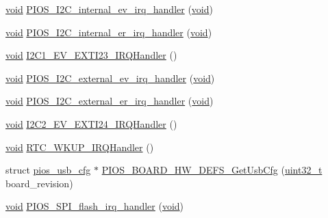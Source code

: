 \begin{DoxyCompactItemize}
\item 
\hyperlink{group___n_a_m_e_ga18028b8badbf1ea7e704ccac3c488e82}{void} \hyperlink{group___tau_labs_core_gad333f8aeebdfbaca768540198dbc3520}{P\-I\-O\-S\-\_\-\-I2\-C\-\_\-internal\-\_\-ev\-\_\-irq\-\_\-handler} (\hyperlink{group___n_a_m_e_ga18028b8badbf1ea7e704ccac3c488e82}{void})
\item 
\hyperlink{group___n_a_m_e_ga18028b8badbf1ea7e704ccac3c488e82}{void} \hyperlink{group___tau_labs_core_gadc581b03bb219d9dfa3e43f594ae3c94}{P\-I\-O\-S\-\_\-\-I2\-C\-\_\-internal\-\_\-er\-\_\-irq\-\_\-handler} (\hyperlink{group___n_a_m_e_ga18028b8badbf1ea7e704ccac3c488e82}{void})
\item 
\hyperlink{group___n_a_m_e_ga18028b8badbf1ea7e704ccac3c488e82}{void} \hyperlink{group___tau_labs_core_ga40edacd7797186e686829d1c3b43f4bc}{I2\-C1\-\_\-\-E\-V\-\_\-\-E\-X\-T\-I23\-\_\-\-I\-R\-Q\-Handler} ()
\item 
\hyperlink{group___n_a_m_e_ga18028b8badbf1ea7e704ccac3c488e82}{void} \hyperlink{group___tau_labs_core_ga33cea9816e9b3737078525aa4f4bcbd2}{P\-I\-O\-S\-\_\-\-I2\-C\-\_\-external\-\_\-ev\-\_\-irq\-\_\-handler} (\hyperlink{group___n_a_m_e_ga18028b8badbf1ea7e704ccac3c488e82}{void})
\item 
\hyperlink{group___n_a_m_e_ga18028b8badbf1ea7e704ccac3c488e82}{void} \hyperlink{group___tau_labs_core_ga1842ef1e30198af0f72d5a0b55420682}{P\-I\-O\-S\-\_\-\-I2\-C\-\_\-external\-\_\-er\-\_\-irq\-\_\-handler} (\hyperlink{group___n_a_m_e_ga18028b8badbf1ea7e704ccac3c488e82}{void})
\item 
\hyperlink{group___n_a_m_e_ga18028b8badbf1ea7e704ccac3c488e82}{void} \hyperlink{group___tau_labs_core_ga860bdffadc546e3969c31b9b00c5d29c}{I2\-C2\-\_\-\-E\-V\-\_\-\-E\-X\-T\-I24\-\_\-\-I\-R\-Q\-Handler} ()
\item 
\hyperlink{group___n_a_m_e_ga18028b8badbf1ea7e704ccac3c488e82}{void} \hyperlink{group___tau_labs_core_ga7e78266985c97f3b7e8a9f91893657d1}{R\-T\-C\-\_\-\-W\-K\-U\-P\-\_\-\-I\-R\-Q\-Handler} ()
\item 
struct \hyperlink{structpios__usb__cfg}{pios\-\_\-usb\-\_\-cfg} $\ast$ \hyperlink{group___tau_labs_core_ga84a688d8fbc8c641c82c2c8720d3e8b2}{P\-I\-O\-S\-\_\-\-B\-O\-A\-R\-D\-\_\-\-H\-W\-\_\-\-D\-E\-F\-S\-\_\-\-Get\-Usb\-Cfg} (\hyperlink{stdint_8h_a435d1572bf3f880d55459d9805097f62}{uint32\-\_\-t} board\-\_\-revision)
\item 
\hyperlink{group___n_a_m_e_ga18028b8badbf1ea7e704ccac3c488e82}{void} \hyperlink{group___tau_labs_core_ga9105498d0634ecb94bb3a816f4fe28c9}{P\-I\-O\-S\-\_\-\-S\-P\-I\-\_\-flash\-\_\-irq\-\_\-handler} (\hyperlink{group___n_a_m_e_ga18028b8badbf1ea7e704ccac3c488e82}{void})

\end{DoxyCompactItemize}
